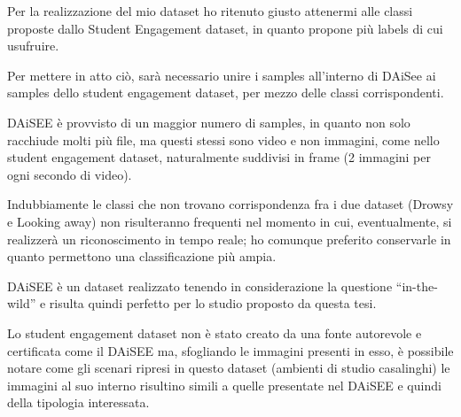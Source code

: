 Per la realizzazione del mio dataset ho ritenuto giusto attenermi alle classi proposte dallo Student Engagement dataset, in quanto propone più labels di cui usufruire.

Per mettere in atto ciò, sarà necessario unire i samples all’interno di DAiSee ai samples dello student engagement dataset, per mezzo delle classi corrispondenti.

DAiSEE è provvisto di un maggior numero di samples, in quanto non solo racchiude molti più file, ma questi stessi sono video e non immagini, come nello student engagement dataset, naturalmente suddivisi in frame (2 immagini per ogni secondo di video).

Indubbiamente le classi che non trovano corrispondenza fra i due dataset (Drowsy e Looking away) non risulteranno frequenti nel momento in cui, eventualmente, si realizzerà un riconoscimento in tempo reale; ho comunque preferito conservarle in quanto permettono una classificazione più ampia.

DAiSEE è un dataset realizzato tenendo in considerazione la questione “in-the-wild” e risulta quindi perfetto per lo studio proposto da questa tesi.

Lo student engagement dataset non è stato creato da una fonte autorevole e certificata come il DAiSEE ma, sfogliando le immagini presenti in esso, è possibile notare come gli scenari ripresi in questo dataset (ambienti di studio casalinghi) le immagini al suo interno risultino simili a quelle presentate nel DAiSEE e quindi della tipologia interessata.
